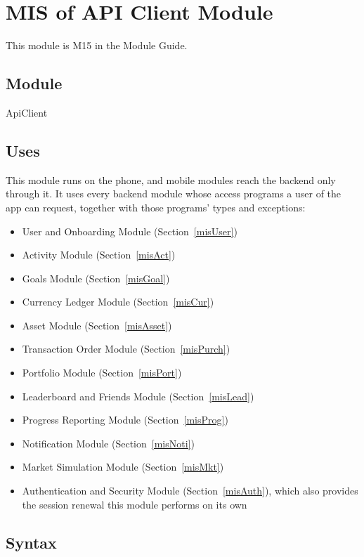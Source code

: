 \documentclass[12pt, titlepage]{article}
\begin{document}
\section{MIS of API Client Module} \label{misAPI}

This module is M15 in the Module Guide.

\subsection{Module}

ApiClient

\subsection{Uses}

\noindent This module runs on the phone, and mobile modules reach the backend
only through it. It uses every backend module whose access programs a user of
the app can request, together with those programs' types and exceptions:

\begin{itemize}
\item User and Onboarding Module (Section~\ref{misUser})
\item Activity Module (Section~\ref{misAct})
\item Goals Module (Section~\ref{misGoal})
\item Currency Ledger Module (Section~\ref{misCur})
\item Asset Module (Section~\ref{misAsset})
\item Transaction Order Module (Section~\ref{misPurch})
\item Portfolio Module (Section~\ref{misPort})
\item Leaderboard and Friends Module (Section~\ref{misLead})
\item Progress Reporting Module (Section~\ref{misProg})
\item Notification Module (Section~\ref{misNoti})
\item Market Simulation Module (Section~\ref{misMkt})
\item Authentication and Security Module (Section~\ref{misAuth}), which also
  provides the session renewal this module performs on its own
\end{itemize}

\subsection{Syntax}
\end{document}
